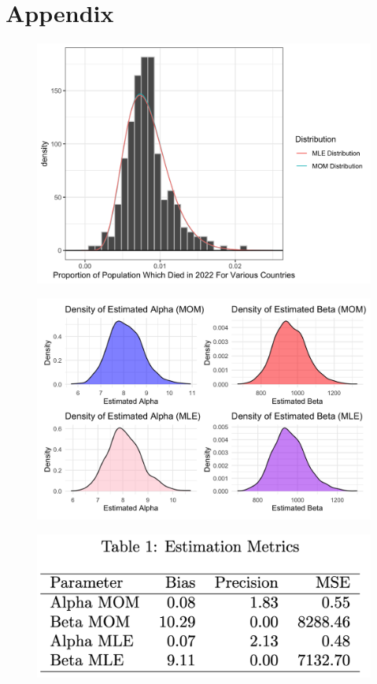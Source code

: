 \documentclass{article}\usepackage[]{graphicx}\usepackage[]{xcolor}
\begin{document}
\onecolumn
\section{Appendix}
\begin{figure}[!htbp]
    \centering
    \includegraphics[width=.75\textwidth]{Rplot06.png}
    \caption{}
    \label{fig:first}
\end{figure}

\begin{figure}[!htbp]
    \centering
    \includegraphics[width=.75\textwidth]{Rplot08.png}
    \caption{}
    \label{fig:second}
\end{figure}

\begin{figure}[!t]
    \vspace{-5in} %
    \centering
    \includegraphics[width=.75\textwidth]{Table}
    \caption{}
    \label{fig:second}
\end{figure}
\end{document}
